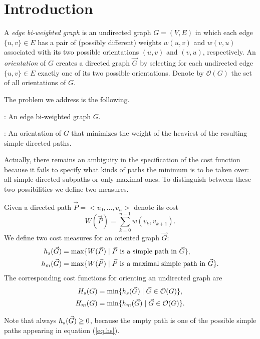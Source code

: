 \section{Introduction}

A \emph{edge bi-weighted graph} is an undirected graph $G = (V, E)$ in which each edge $\{u, v\} \in E$ has a pair of (possibly different) weights $w(u, v)$ and $w(v, u)$ associated with its two possible orientations $(u, v)$ and $(v, u)$, respectively. An \emph{orientation} 
of $G$ creates a directed graph $\vec{G}$ 
by selecting for each undirected edge $\{u, v\} \in E$ exactly one of its two possible orientations. Denote by $\mathcal{O}(G)$ the set of all orientations of $G$. 

The problem we address is the following.

: An edge bi-weighted graph $G$.

: An orientation  of $G$ that minimizes the weight of 
the heaviest of the resulting simple directed paths.

Actually, there remains an ambiguity in the specification of the cost function because it 
fails to specify what kinds of paths the minimum is to be taken over: all simple 
directed subpaths or only maximal ones. To distinguish between these two possibilities we define two measures.

\begin{definition}
	Given a directed path $\vec{P}=<v_0,\ldots,v_n>$ denote its cost
	\begin{equation}\label{eq.W}
		W(\vec{P})=\sum_{k=0}^{n-1} w(v_k,v_{k+1}).
	\end{equation}
	We define two cost measures for an oriented graph $\vec{G}$:
	\begin{align} 
		h_s(\vec{G}) &= \max\{W(\vec{P})\mid \vec{P} \mbox{ is a simple path in }\vec{G} \},\label{eq.hs} \\
		h_m(\vec{G}) &= \max\{W(\vec{P})\mid \vec{P} \mbox{ is a maximal simple path in }\vec{G} \}.\label{eq.hm}
	\end{align}
	The corresponding cost functions for orienting an undirected graph are 
	\begin{align}
		H_s(G) &= \min\{h_s(\vec{G})\mid \vec{G} \in \mathcal{O}(G)\}, \\
		H_m(G) &= \min\{h_m(\vec{G})\mid \vec{G} \in \mathcal{O}(G)\}.
	\end{align}
\end{definition}
Note that always $h_s(\vec{G})\geq 0$, because the empty path is one of the possible simple paths appearing in equation (\ref{eq.hs}).

